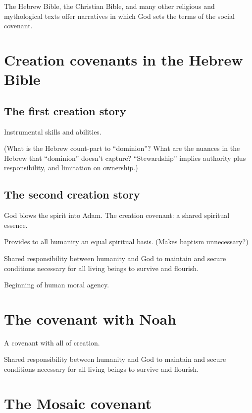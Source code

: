 \documentclass[
]{book}
\begin{document}
The Hebrew Bible, the Christian Bible, and many other religious and mythological texts offer narratives in which God sets the terms of the social covenant.

\hypertarget{creation-covenants-in-the-hebrew-bible}{%
\section{Creation covenants in the Hebrew Bible}\label{creation-covenants-in-the-hebrew-bible}}

\hypertarget{the-first-creation-story}{%
\subsection{The first creation story}\label{the-first-creation-story}}

Instrumental skills and abilities.

(What is the Hebrew count-part to ``dominion''? What are the nuances in
the Hebrew that ``dominion'' doesn't capture? ``Stewardship'' implies
authority plus responsibility, and limitation on ownership.)

\hypertarget{the-second-creation-story}{%
\subsection{The second creation story}\label{the-second-creation-story}}

God blows the spirit into Adam.
The creation covenant: a shared spiritual essence.

Provides to all humanity an equal spiritual basis. (Makes baptism
unnecessary?)

Shared responsibility between humanity and God to maintain and secure
conditions necessary for all living beings to survive and flourish.

Beginning of human moral agency.

\hypertarget{the-covenant-with-noah}{%
\section{The covenant with Noah}\label{the-covenant-with-noah}}

A covenant with all of creation.

Shared responsibility between humanity and God to maintain and secure
conditions necessary for all living beings to survive and flourish.

\hypertarget{the-mosaic-covenant}{%
\section{The Mosaic covenant}\label{the-mosaic-covenant}}
\end{document}
